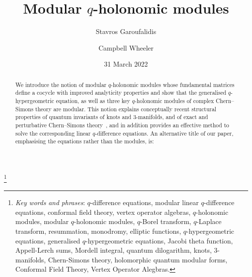 \documentclass[12pt,reqno]{amsart}
\theoremstyle{definition}
\begin{document}
\title[Modular $q$-holonomic modules]{
       Modular $q$-holonomic modules}
\author{Stavros Garoufalidis}
\address{%
  International Center for Mathematics, Department of Mathematics \\
  Southern University of Science and Technology \\
  Shenzhen, China \newline
  {\tt \url{http://people.mpim-bonn.mpg.de/stavros}}}
\author{Campbell Wheeler}
\address{Max Planck Institute for Mathematics \\
         Vivatsgasse 7, 53111 Bonn, Germany \newline
         {\tt \url{http://guests.mpim-bonn.mpg.de/cjwh}}}

\thanks{
  {\em Key words and phrases}: $q$-difference equations, modular linear
  $q$-difference equations, conformal field theory, vertex operator algebras,
  $q$-holonomic modules, modular $q$-holonomic modules, $q$-Borel transform,
  $q$-Laplace transform, resummation, monodromy, elliptic functions,
  $q$-hypergeometric equations, generalised $q$-hypergeometric equations,
  Jacobi theta function, Appell-Lerch sums, Mordell integral, quantum dilogarithm, 
  knots, 3-manifolds, Chern-Simons theory, holomorphic quantum modular forms,
  Conformal Field Theory, Vertex Operator Alegbras.
}

\date{31 March 2022}%

\begin{abstract}
  We introduce the notion of modular $q$-holonomic modules 
  whose fundamental matrices define a cocycle with improved analyticity properties
  and show that the generalised $q$-hypergeometric equation, as well as three
  key $q$-holonomic modules of complex Chern--Simons theory are modular. 
  This notion explains conceptually recent structural properties of quantum
  invariants of knots and 3-manifolds, and of exact and perturbative Chern--Simons
  theory~\cite{GGM:peacock,GGM,GGMW:trivial,GZ:kashaev}, and in addition provides
  an effective method to solve the corresponding linear $q$-difference equations.
  An alternative title of our paper, emphasising the equations rather than the
  modules, is: 
  \medskip
  \begin{center}
\end{center}
\end{abstract}
\end{document}
